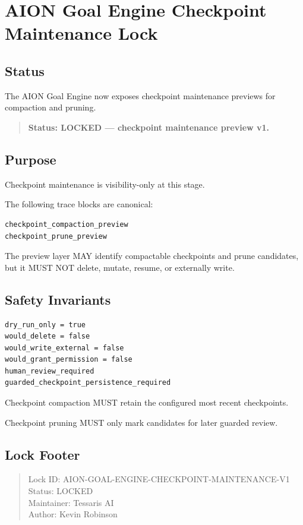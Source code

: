\section{AION Goal Engine Checkpoint Maintenance Lock}
\label{sec:aion-goal-engine-checkpoint-maintenance-lock}

\subsection{Status}

The AION Goal Engine now exposes checkpoint maintenance previews for compaction and pruning.

\begin{quote}
\textbf{Status: LOCKED --- checkpoint maintenance preview v1.}
\end{quote}

\subsection{Purpose}

Checkpoint maintenance is visibility-only at this stage.

The following trace blocks are canonical:

\begin{verbatim}
checkpoint_compaction_preview
checkpoint_prune_preview
\end{verbatim}

The preview layer MAY identify compactable checkpoints and prune candidates, but it MUST NOT delete, mutate, resume, or externally write.

\subsection{Safety Invariants}

\begin{verbatim}
dry_run_only = true
would_delete = false
would_write_external = false
would_grant_permission = false
human_review_required
guarded_checkpoint_persistence_required
\end{verbatim}

Checkpoint compaction MUST retain the configured most recent checkpoints.

Checkpoint pruning MUST only mark candidates for later guarded review.

\subsection{Lock Footer}

\begin{quote}
Lock ID: AION-GOAL-ENGINE-CHECKPOINT-MAINTENANCE-V1\\
Status: LOCKED\\
Maintainer: Tessaris AI\\
Author: Kevin Robinson
\end{quote}
